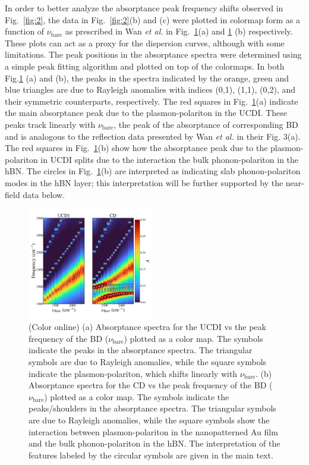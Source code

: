 \documentclass[reprint,
amsmath,amssymb,
aip,
jap,
floatfix,]{revtex4-2}
\begin{document}
				In order to better analyze the absorptance peak frequency shifts observed in Fig.~\ref{fig:2}, the data in Fig.~\ref{fig:2}(b) and (c) were plotted in colormap form as a function of $\nu_\mathrm{bare}$ as prescribed in Wan \textit{et al.} \cite{Wan:16} in Fig.~\ref{fig:3}(a) and \ref{fig:3} (b) respectively. These plots can act as a proxy for the dispersion curves, although with some limitations. The peak positions in the absorptance spectra were determined using a simple peak fitting algorithm \cite{peakfinding} and plotted on top of the colormaps. In both Fig.\ref{fig:3} (a) and (b), the peaks in the spectra indicated by the orange, green and blue triangles are due to Rayleigh anomalies \cite{Wood:1902,Rayleigh:1907,Gao:2009} with indices (0,1), (1,1), (0,2), and their symmetric counterparts, respectively. The red squares in Fig.~\ref{fig:3}(a) indicate the main absorptance peak due to the plasmon-polariton in the UCDI. These peaks track linearly with $\nu_\mathrm{bare}$, the peak of the absorptance of corresponding BD and is analogous to the reflection data presented by Wan \textit{et al.} \cite{Wan:16} in their Fig. 3(a). The red squares in Fig.~\ref{fig:3}(b) show how the absorptance peak due to the plasmon-polariton in UCDI splits due to the interaction the bulk phonon-polariton in the hBN. The circles in Fig.~\ref{fig:3}(b) are interpreted as indicating slab phonon-polariton modes in the hBN layer; this interpretation will be further supported by the near-field data below.

				\begin{figure}[!htb]
				  \includegraphics[width=0.49\textwidth]{Figures/Fig3.pdf}
				  \caption{(Color online) (a) Absorptance spectra for the UCDI vs the peak frequency of the BD ($\nu_\mathrm{bare}$) plotted as a color map. The symbols indicate the peaks in the absorptance spectra. The triangular symbols are due to Rayleigh anomalies, while the square symbols indicate the plasmon-polariton, which shifts linearly with $\nu_\mathrm{bare}$.
				    (b) Absorptance spectra for the CD vs the peak frequency of the BD ($\nu_\mathrm{bare}$) plotted as a color map. The symbols indicate the peaks/shoulders in the absorptance spectra. The triangular symbols are due to Rayleigh anomalies, while the square symbols show the interaction between plasmon-polariton in the nanopatterned Au film and the bulk phonon-polariton in the hBN. The interpretation of the features labeled by the circular symbols are given in the main text.}
				  \label{fig:3}
				\end{figure}
\end{document}

